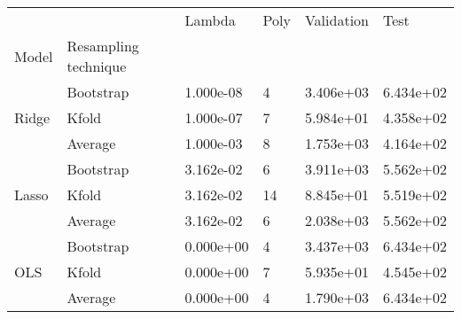 \begin{tabular}{llllll}
\toprule
    &         &    Lambda & Poly & Validation &      Test \\
Model & Resampling technique &           &      &            &           \\
\midrule
\multirow{3}{*}{Ridge} & Bootstrap & 1.000e-08 &    4 &  3.406e+03 & 6.434e+02 \\
    & Kfold & 1.000e-07 &    7 &  5.984e+01 & 4.358e+02 \\
    & Average & 1.000e-03 &    8 &  1.753e+03 & 4.164e+02 \\
\cline{1-6}
\multirow{3}{*}{Lasso} & Bootstrap & 3.162e-02 &    6 &  3.911e+03 & 5.562e+02 \\
    & Kfold & 3.162e-02 &   14 &  8.845e+01 & 5.519e+02 \\
    & Average & 3.162e-02 &    6 &  2.038e+03 & 5.562e+02 \\
\cline{1-6}
\multirow{3}{*}{OLS} & Bootstrap & 0.000e+00 &    4 &  3.437e+03 & 6.434e+02 \\
    & Kfold & 0.000e+00 &    7 &  5.935e+01 & 4.545e+02 \\
    & Average & 0.000e+00 &    4 &  1.790e+03 & 6.434e+02 \\
\bottomrule
\end{tabular}
